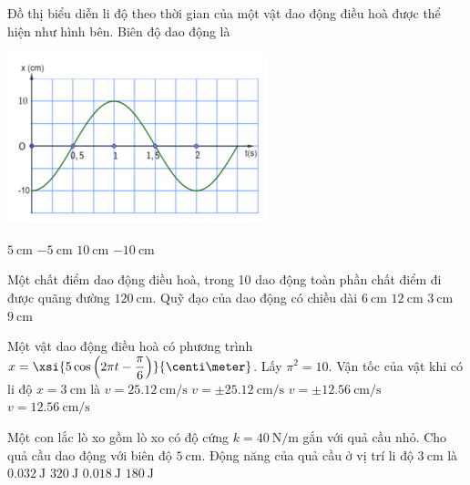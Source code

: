 \begin{ex}
Đồ thị biểu diễn li độ theo thời gian của một vật dao động điều hoà được thể hiện như hình bên. Biên độ dao động là
\begin{center}
	\includegraphics[width=0.4\linewidth]{../figs/C1-Q-2}
\end{center}	
	\choice
	{$\SI{5}{\centi\meter}$}
	{$\SI{-5}{\centi\meter}$}
	{\True $\SI{10}{\centi\meter}$}
	{$\SI{-10}{\centi\meter}$}
	\loigiai{}
\end{ex}
\begin{ex}
	Một chất điểm dao động điều hoà, trong 10 dao động toàn phần chất điểm đi được quãng đường $\SI{120}{\centi\meter}$. Quỹ đạo của dao động có chiều dài
	\choice
	{\True $\SI{6}{\centi\meter}$}
	{$\SI{12}{\centi\meter}$}
	{$\SI{3}{\centi\meter}$}
	{$\SI{9}{\centi\meter}$}
\end{ex}
\begin{ex}
	Một vật dao động điều hoà có phương trình $x=\xsi{5\cos\left(2\pi t-\dfrac{\pi}{6}\right)}{\centi\meter}$. Lấy $\pi^2=10$. Vận tốc của vật khi có li độ $x=\SI{3}{\centi\meter}$ là
	\choice
	{$v=\SI{25.12}{\centi\meter/\second}$}
	{\True $v=\pm\SI{25.12}{\centi\meter/\second}$}
	{$v=\pm\SI{12.56}{\centi\meter/\second}$}
	{$v=\SI{12.56}{\centi\meter/\second}$}
\end{ex}
\begin{ex}
	Một con lắc lò xo gồm lò xo có độ cứng $k=\SI{40}{\newton/\meter}$ gắn với quả cầu nhỏ. Cho quả cầu dao động với biên độ $\SI{5}{\centi\meter}$. Động năng của quả cầu ở vị trí li độ $\SI{3}{\centi\meter}$ là
	\choice
	{\True $\SI{0.032}{\joule}$}
	{$\SI{320}{\joule}$}
	{$\SI{0.018}{\joule}$}
	{$\SI{180}{\joule}$}
\end{ex}
